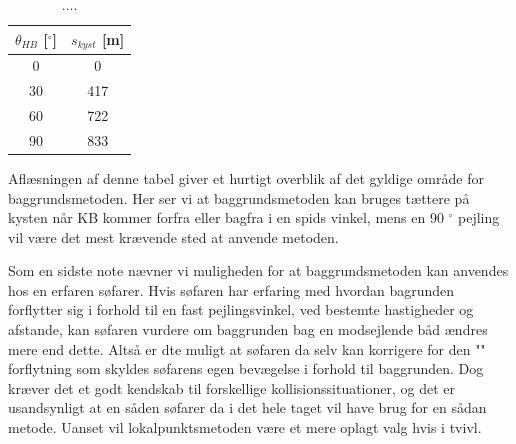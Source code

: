\documentclass[%
 reprint,
nofootinbib,
aps,
]{revtex4-1}
\begin{document}
\begin{table}[H]
 \begin{center}
 \caption{....}
 \begin{tabular}{|c|c|} \hline
 $\theta_{HB}$ [$^{\circ}$] & $s_{kyst}$ [m]  \\ \hline
 0 & 0 \\ \hline
 30 & 417 \\ \hline
 60 & 722  \\ \hline
 90 & 833 \\ \hline
 \end{tabular}
 \end{center}
 \label{tab:valid_area}
\end{table}
Aflæsningen af denne tabel giver et hurtigt overblik af det gyldige område for baggrundsmetoden. Her ser vi at baggrundsmetoden kan bruges tættere på kysten når KB kommer forfra eller bagfra i en spids vinkel, mens en 90 $^{\circ}$ pejling vil være det mest krævende sted at anvende metoden. \par
Som en sidste note nævner vi muligheden for at baggrundsmetoden kan anvendes hos en erfaren søfarer. Hvis søfaren har erfaring med hvordan bagrunden forflytter sig i forhold til en fast pejlingsvinkel, ved bestemte hastigheder og afstande, kan søfaren vurdere om baggrunden bag en modsejlende båd ændres mere end dette. Altså er dte muligt at søfaren da selv kan korrigere for den "" forflytning som skyldes søfarens egen bevægelse i forhold til baggrunden. Dog kræver det et godt kendskab til forskellige kollisionssituationer, og det er usandsynligt at en såden søfarer da i det hele taget vil have brug for en sådan metode. Uanset vil lokalpunktsmetoden være et mere oplagt valg hvis i tvivl.
\linebreak


\newpage
\end{document}
